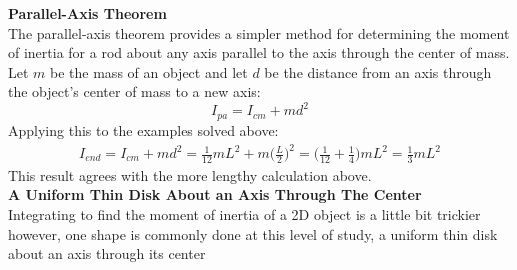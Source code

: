 \documentclass[a4paper]{article}
\let\bf\textbf
\newcommand{\AxisRotator}[1][rotate=0]{%
    \tikz [x=0.25cm,y=0.60cm,line width=.2ex,-stealth,#1] \draw (0,0) arc (-150:150:1 and 1);%
}
\begin{document}
\begin{center}
\end{center}
\bf{Parallel-Axis Theorem}
\vspace{2mm}\\
The parallel-axis theorem provides a simpler method for determining the moment of inertia for a rod about any axis parallel to the axis through the center of mass.
\vspace{1mm}\\
Let $m$ be the mass of an object and let $d$ be the distance from an axis through the object's center of mass to a new axis:
\begin{equation}
    I_{pa} = I_{cm} + md^2
\end{equation}
Applying this to the examples solved above:
\begin{align*}
    I_{end} = I_{cm} + md^2 = \frac{1}{12}mL^2 + m\bigg(\frac{L}{2}\bigg)^2 = \bigg(\frac{1}{12} + \frac{1}{4}\bigg)mL^2 = \frac{1}{3}mL^2
\end{align*}
This result agrees with the more lengthy calculation above.
\vspace{2mm}\\
\bf{A Uniform Thin Disk About an Axis Through The Center}
\vspace{2mm}\\
Integrating to find the moment of inertia of a 2D object is a little bit trickier however, one shape is commonly done at this level of study, a uniform thin disk about an axis through its center
\end{document}
